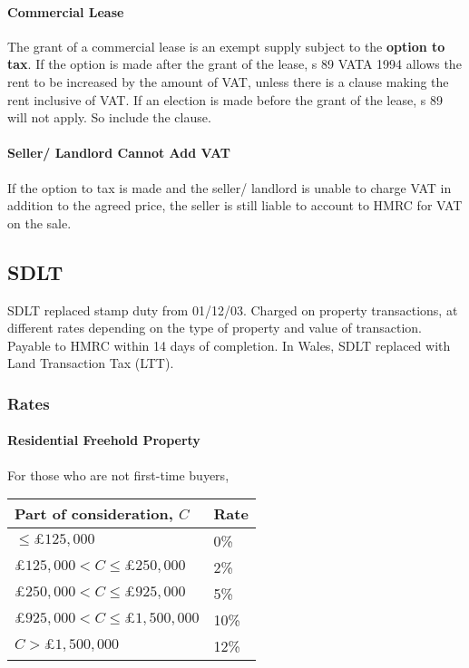 \documentclass[
]{article}
\begin{document}
\hypertarget{commercial-lease}{%
\paragraph{Commercial Lease}\label{commercial-lease}}

The grant of a commercial lease is an exempt supply subject to the
\textbf{option to tax}. If the option is made after the grant of the
lease, s 89 VATA 1994 allows the rent to be increased by the amount of
VAT, unless there is a clause making the rent inclusive of VAT. If an
election is made before the grant of the lease, s 89 will not apply. So
include the clause.

\hypertarget{seller-landlord-cannot-add-vat}{%
\paragraph{Seller/ Landlord Cannot Add
VAT}\label{seller-landlord-cannot-add-vat}}

If the option to tax is made and the seller/ landlord is unable to
charge VAT in addition to the agreed price, the seller is still liable
to account to HMRC for VAT on the sale.

\hypertarget{sdlt}{%
\subsection{SDLT}\label{sdlt}}

SDLT replaced stamp duty from 01/12/03. Charged on property
transactions, at different rates depending on the type of property and
value of transaction. Payable to HMRC within 14 days of completion. In
Wales, SDLT replaced with Land Transaction Tax (LTT).

\hypertarget{rates}{%
\subsubsection{Rates}\label{rates}}

\hypertarget{residential-freehold-property}{%
\paragraph{Residential Freehold
Property}\label{residential-freehold-property}}

For those who are not first-time buyers,

\begin{longtable}[]{@{}ll@{}}
\toprule()
Part of consideration, {\(C\)} & Rate \\
\midrule()
\endhead
{\(\leq \pounds 125,000\)} & 0\% \\
{\(\pounds 125,000 < C \leq \pounds 250,000\)} & 2\% \\
{\(\pounds 250,000 < C \leq \pounds 925,000\)} & 5\% \\
{\(\pounds 925,000 < C \leq \pounds 1,500,000\)} & 10\% \\
{\(C > \pounds 1,500,000\)} & 12\% \\
\bottomrule()
\end{longtable}
\end{document}
